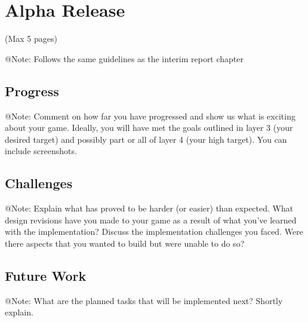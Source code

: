\chapter{Alpha Release}

\begin{TempText}
	(Max 5 pages)
\end{TempText}

\begin{TempText}
	@Note: Follows the same guidelines as the interim report chapter
\end{TempText}


\section{Progress}

\begin{TempText}
	@Note: Comment on how far you have progressed and show us what is exciting about your game. Ideally, you will have met the goals outlined in layer 3 (your desired target) and possibly part or all of layer 4 (your high target). You can include screenshots.
\end{TempText}


\section{Challenges}

\begin{TempText}
	@Note: Explain what has proved to be harder (or easier) than expected. What design revisions have you made to your game as a result of what you've learned with the implementation? Discuss the implementation challenges you faced. Were there aspects that you wanted to build but were unable to do so?
\end{TempText}


\section{Future Work}

\begin{TempText}
	@Note: What are the planned tasks that will be implemented next? Shortly explain.
\end{TempText}

